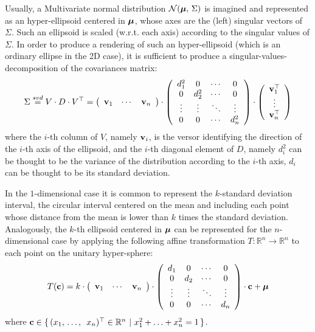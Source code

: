 		Usually, a Multivariate normal distribution $\mathcal{N}(\boldsymbol{\mathrm{{\mu}}},\, \Sigma)$ is imagined and represented as an hyper-ellipsoid centered in $\boldsymbol{\mathrm{{\mu}}}$, whose axes are the (left) singular vectors of $\Sigma$. Such an ellipsoid is scaled (w.r.t. each axis) according to the singular values of $\Sigma$.
		In order to produce a rendering of such an hyper-ellipsoid (which is an ordinary ellipse in the 2D case), it is sufficient to produce a singular-values-decomposition of the covariances matrix:
		\[
			\Sigma \stackrel{svd}{=} V \cdot D \cdot V^\top = 
			\left(\begin{array}{ccc}
				\boldsymbol{\mathrm{{v}}}_1 & \cdots & \boldsymbol{\mathrm{{v}}}_n
			\end{array}\right)
			\cdot
			\left(\begin{array}{cccc}
				d_1^2 & 0 & \cdots & 0 \\
				0 & d_2^2 & \cdots & 0 \\
				\vdots & \vdots & \ddots & \vdots \\
				0 & 0 & \cdots & d_n^2
			\end{array}\right)
			\cdot
			\left(\begin{array}{c}
				\boldsymbol{\mathrm{{v}}}_1^\top \\
				\vdots \\
				\boldsymbol{\mathrm{{v}}}_n^\top
			\end{array}\right)
		\]
		where the $i$-th column of $V$, namely $\boldsymbol{\mathrm{{v}}}_i$, is the versor identifying the direction of the $i$-th axis of the ellipsoid, and the $i$-th diagonal element of $D$, namely $d_i^2$ can be thought to be the variance of the distribution according to the $i$-th axis, \ie{} $d_i$ can be thought to be its standard deviation.
		
		In the $1$-dimensional case it is common to represent the $k$-standard deviation interval, \ie{} the circular interval centered on the mean and including each point whose distance from the mean is lower than $k$ times the standard deviation. Analogously, the $k$-th ellipsoid centered in $\boldsymbol{\mathrm{{\mu}}}$ can be represented for the $n$-dimensional case by applying the following affine transformation $T : \mathbb{R}^n \rightarrow \mathbb{R}^n$ to each point on the unitary hyper-sphere:
		\[
			T(\boldsymbol{\mathrm{{c}}}) = k \cdot 
			\left(\begin{array}{ccc}
				\boldsymbol{\mathrm{{v}}}_1 & \cdots & \boldsymbol{\mathrm{{v}}}_n
			\end{array}\right)
			\cdot
			\left(\begin{array}{cccc}
				d_1 & 0 & \cdots & 0 \\
				0 & d_2 & \cdots & 0 \\
				\vdots & \vdots & \ddots & \vdots \\
				0 & 0 & \cdots & d_n
			\end{array}\right)
			\cdot
			\boldsymbol{\mathrm{{c}}} + \boldsymbol{\mathrm{{\mu}}}
		\]
		where $\boldsymbol{\mathrm{{c}}} \in \{\, (x_1,\, \ldots,\,\ x_n)^\top \in \mathbb{R}^n \ |\  x_1^2 + \ldots + x_n^2 = 1 \,\}$.
		
